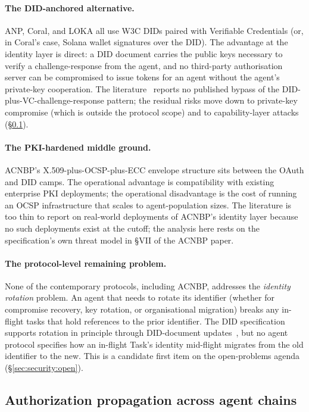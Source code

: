 \paragraph{The DID-anchored alternative.}
ANP, Coral, and LOKA all use W3C DIDs paired with Verifiable
Credentials (or, in Coral's case, Solana wallet signatures
over the DID). The advantage at the identity layer is
direct: a DID document carries the public keys necessary to
verify a challenge-response from the agent, and no
third-party authorisation server can be compromised to
issue tokens for an agent without the agent's
private-key cooperation. The
literature~\cite{did_vc_agents, spec_anp, spec_loka} reports
no published bypass of the
DID-plus-VC-challenge-response pattern; the residual risks
move down to private-key compromise (which is outside the
protocol scope) and to capability-layer attacks
(\S\ref{sec:security:authz}).

\paragraph{The PKI-hardened middle ground.}
ACNBP's X.509-plus-OCSP-plus-ECC envelope structure
\cite{spec_acnbp} sits between the OAuth and DID camps. The
operational advantage is compatibility with existing
enterprise PKI deployments; the operational disadvantage is
the cost of running an OCSP infrastructure that scales to
agent-population sizes. The literature is too thin to
report on real-world deployments of ACNBP's identity layer
because no such deployments exist at the cutoff; the
analysis here rests on the specification's own threat
model in \S VII of the ACNBP paper.

\paragraph{The protocol-level remaining problem.}
None of the contemporary protocols, including ACNBP,
addresses the \emph{identity rotation} problem. An agent
that needs to rotate its identifier (whether for compromise
recovery, key rotation, or organisational migration)
breaks any in-flight tasks that hold references to the
prior identifier. The DID specification supports rotation
in principle through DID-document
updates~\cite{w3c_did_core}, but no agent
protocol specifies how an in-flight Task's identity
mid-flight migrates from the old identifier to the new.
This is a candidate first item on the open-problems
agenda (\S\ref{sec:security:open}).

\subsection{Authorization propagation across agent chains}
\label{sec:security:authz}

